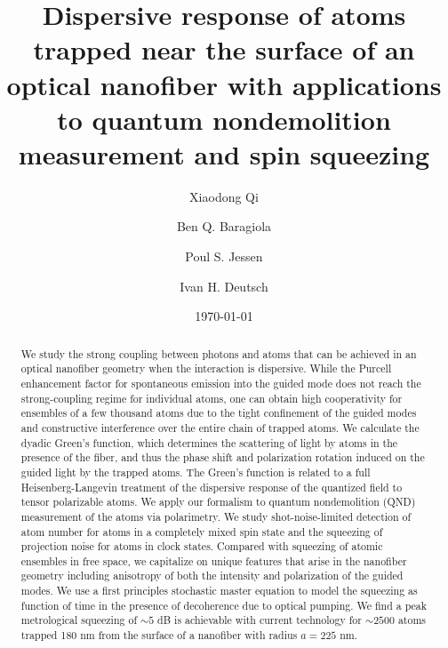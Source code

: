 \documentclass[preprint, aps,pra,onecolumn]{revtex4-1} %
\begin{document}
\title{Dispersive response of atoms trapped near the surface of an optical nanofiber with applications to quantum nondemolition measurement and spin squeezing}
\author{Xiaodong Qi}
\author{Ben Q. Baragiola}
\author{Poul S. Jessen}
\author{Ivan H. Deutsch}
\date{\today}

\begin{abstract}
We study the strong coupling between photons and atoms that can be achieved in an optical nanofiber geometry when the interaction is dispersive.  While the Purcell enhancement factor for spontaneous emission into the guided mode does not reach the strong-coupling regime for individual atoms, one can obtain high cooperativity for ensembles of a few thousand atoms due to the tight confinement of the guided modes and constructive interference over the entire chain of trapped atoms. We calculate the dyadic Green's function, which determines the scattering of light by atoms in the presence of the fiber, and thus the phase shift and polarization rotation induced on the guided light by the trapped atoms.  The Green's function is related to a full Heisenberg-Langevin treatment of the dispersive response of the quantized field to tensor polarizable atoms.  We apply our formalism to quantum nondemolition (QND) measurement of the atoms via polarimetry.  We study shot-noise-limited detection of atom number for atoms in a completely mixed spin state and the squeezing of projection noise for atoms in clock states.  Compared with squeezing of atomic ensembles in free space, we capitalize on unique features that arise in the nanofiber geometry including anisotropy of both the intensity and polarization of the guided modes.  We use a first principles stochastic master equation to model the squeezing as function of time in the presence of decoherence due to optical pumping.  We find a peak metrological squeezing of $\sim 5$ dB is achievable with current technology for $\sim 2500$ atoms trapped 180 nm from the surface of a nanofiber with radius $a=225$ nm.  
\end{abstract}
\end{document}
